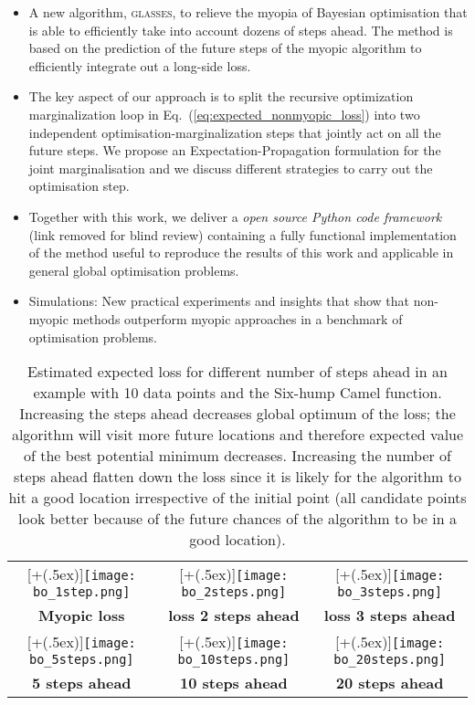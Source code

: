 \documentclass[twoside]{article}
\newcommand{\acr}[1]{\textsc{#1}\xspace}
\newcommand{\us}{\acr{glasses}}
\newcommand*{\addheight}[2][.5ex]{%
  \raisebox{0pt}[\dimexpr\height+(#1)\relax]{#2}%
}
\begin{document}
\begin{itemize}
\item A new algorithm, \us, to relieve the myopia of Bayesian optimisation that is able to efficiently take into account dozens of steps ahead. The method is based on the prediction of the future steps of the myopic algorithm to efficiently integrate out a long-side loss. 
\item The key aspect of our approach is to split the recursive optimization marginalization loop in Eq.~(\ref{eq:expected_nonmyopic_loss}) into two independent optimisation-marginalization steps that jointly act on all the future steps. We propose an Expectation-Propagation formulation for the joint marginalisation and we discuss different strategies to carry out the optimisation step.
\item Together with this work, we deliver a \emph{open source Python code framework} (link removed for blind review) containing a fully functional  implementation of the method useful to reproduce the results of this work and applicable in general global optimisation problems.
\item Simulations: New practical experiments and insights that show that non-myopic methods outperform myopic approaches in a benchmark of optimisation problems.
\end{itemize}



\begin{table*}[t!]
\begin{tabular}{ccc}
      \addheight{\texttt{[image: bo\_1step.png]}} &
      \addheight{\texttt{[image: bo\_2steps.png]}}  &
      \addheight{\texttt{[image: bo\_3steps.png]}}\\
      \small \textbf{Myopic loss} &  \small \textbf{loss 2 steps ahead} & \small \textbf{loss 3 steps ahead} \\
      \addheight{\texttt{[image: bo\_5steps.png]}} &
      \addheight{\texttt{[image: bo\_10steps.png]}}  &
      \addheight{\texttt{[image: bo\_20steps.png]}}\\
      \small \small \textbf{5 steps ahead} & \small \textbf{10 steps ahead} & \small \textbf{20 steps ahead} \\
\end{tabular}\caption{Estimated expected loss for different number of steps ahead in an example with 10 data points and the Six-hump Camel function. Increasing the steps ahead decreases global optimum of the loss; the algorithm will visit more future locations and therefore expected value of the best potential minimum decreases. Increasing the number of steps ahead flatten down the loss since it is likely for the algorithm to hit a good location irrespective of the initial point (all candidate points look better because of the future chances of the algorithm to be in a good location).}
\end{table*}
\end{document}
